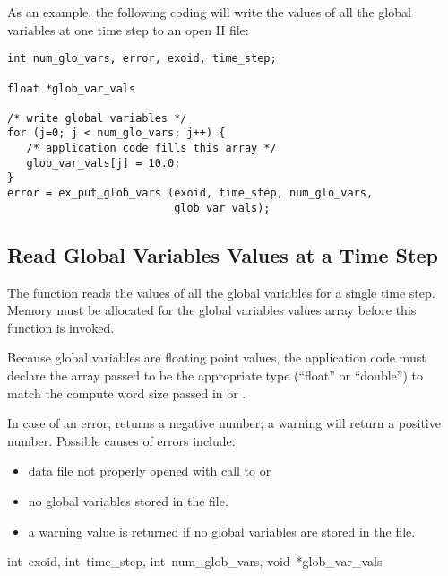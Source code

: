 As an example, the following coding will write the values of all the
global variables at one time step to an open \exo{} II file:

\begin{lstlisting}
int num_glo_vars, error, exoid, time_step;

float *glob_var_vals

/* write global variables */
for (j=0; j < num_glo_vars; j++) {
   /* application code fills this array */
   glob_var_vals[j] = 10.0;
}
error = ex_put_glob_vars (exoid, time_step, num_glo_vars, 
                          glob_var_vals);
\end{lstlisting}

\subsection{Read Global Variables Values at a Time Step}

The function  reads the values of all the
global variables for a single time step. Memory must be allocated for
the global variables values array before this function is invoked.

Because global variables are floating point values, the application
code must declare the array passed to be the appropriate type
(``float'' or ``double'') to match the compute word size passed in
 or .

In case of an error,  returns a negative
number; a warning will return a positive number. Possible causes of
errors include:

\begin{itemize}
 \item data file not properly opened with call to 
 or 

 \item no global variables stored in the file.

 \item a warning value is returned if no global variables are stored
 in the file.
\end{itemize}


{int~exoid, 
int~time_step, 
int~num_glob_vars,
void~*glob_var_vals}


